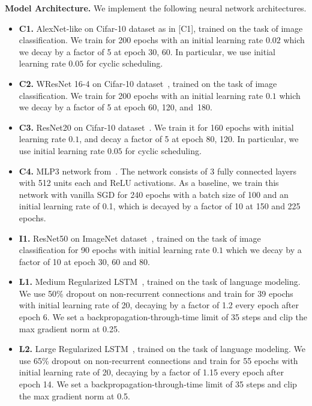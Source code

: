 \textbf{Model Architecture.}
We implement the following neural network architectures. 
\begin{itemize}[noitemsep,topsep=0pt,parsep=0pt,partopsep=0pt,leftmargin=*]

\item \textbf{C1.} AlexNet-like on Cifar-10 dataset as in \citep{yao2018hessian}[C1], trained on the task of image classification. We train for 200 epochs with an initial learning rate $0.02$ which we decay by a factor of 5 at epoch 30, 60. In particular, we use initial learning rate $0.05$ for cyclic scheduling.

\item \textbf{C2.} WResNet 16-4 on Cifar-10 dataset~\citep{zagoruyko2016wide}, trained on the task of image classification. We train for 200 epochs with an initial learning rate $0.1$ which we decay by a factor of 5 at epoch 60, 120, and~180.

\item \textbf{C3.} ResNet20 on Cifar-10 dataset~\citep{he2016deep}. We train it for 160 epochs with initial learning rate $0.1$, and decay a factor of 5 at epoch 80, 120. In particular, we use initial learning rate $0.05$ for cyclic scheduling.

\item \textbf{C4.} MLP3 network from~\citep{martin2018implicit}. The network consists of 3 fully connected layers with 512 units each and ReLU activations. As a baseline, we train this network with vanilla SGD for 240 epochs with a batch size of 100 and an initial learning rate of 0.1, which is decayed by a factor of 10 at  150 and 225 epochs.

\item \textbf{I1.} ResNet50 on ImageNet dataset~\citep{he2016deep}, trained on the task of image classification for 90 epochs with initial learning rate $0.1$ which we decay by a factor of 10 at epoch 30, 60 and 80.

\item \textbf{L1.} Medium Regularized LSTM~\citep{zaremba2014recurrent}, trained on the task of language modeling. We use 50\% dropout on non-recurrent connections and train for 39 epochs with initial learning rate of 20, decaying by a factor of 1.2 every epoch after epoch 6. We set a backpropagation-through-time limit of 35 steps and clip the max gradient norm at 0.25.

\item \textbf{L2.} Large Regularized LSTM~\citep{zaremba2014recurrent}, trained on the task of language modeling. We use 65\% dropout on non-recurrent connections and train for 55 epochs with initial learning rate of 20, decaying by a factor of 1.15 every epoch after epoch 14. We set a backpropagation-through-time limit of 35 steps and clip the max gradient norm at 0.5.


\end{itemize}
